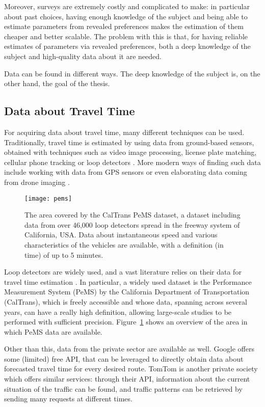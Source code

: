 Moreover, surveys are extremely costly and complicated to make:
in particular about past choices, having enough knowledge of the subject
and being able to estimate parameters from revealed preferences
makes the estimation of them cheaper and better scalable.
The problem with this is that,
for having reliable estimates of parameters via revealed preferences,
both a deep knowledge of the subject and high-quality data about it are needed.

Data can be found in different ways.
The deep knowledge of the subject is, on the other hand, the goal of the thesis.

\subsection{Data about Travel Time}
\label{sec:data-about-travel}

For acquiring data about travel time, many different techniques can be used.
Traditionally, travel time is estimated by using data from ground-based sensors,
obtained with techniques such as video image processing, license plate matching, cellular phone tracking or loop detectors \parencite{turner1996advanced,YEON2008325}.
More modern ways of finding such data include working with data from GPS sensors \parencite{mazare2012trade} or even elaborating data coming from drone imaging \parencite{fonod2025songdo}.

\begin{figure}
  \centering
  \texttt{[image: pems]}
  \caption{The area covered by the CalTrans PeMS dataset, a dataset including data from over 46,000 loop detectors spread in the freeway system of California, USA. Data about instantaneous speed and various characteristics of the vehicles are available, with a definition (in time) of up to 5 minutes.}
  \label{fig:pems}
\end{figure}

Loop detectors are widely used, and a vast literature relies on their data for travel time estimation \parencite{YILDIRIMOGLU201345}.
In particular, a widely used dataset is the Performance Measurement System (PeMS) by the California Department of Transportation (CalTrans),
which is freely accessible and whose data, spanning across several years,
can have a really high definition,
allowing large-scale studies to be performed with sufficient precision.
Figure~\ref{fig:pems} shows an overview of the area in which PeMS data are available.

Other than this, data from the private sector are available as well.
Google offers some (limited) free API,
that can be leveraged to directly obtain data about forecasted travel time for every desired route.
TomTom is another private society which offers similar services:
through their API, information about the current situation of the traffic can be found,
and traffic patterns can be retrieved by sending many requests at different times.

